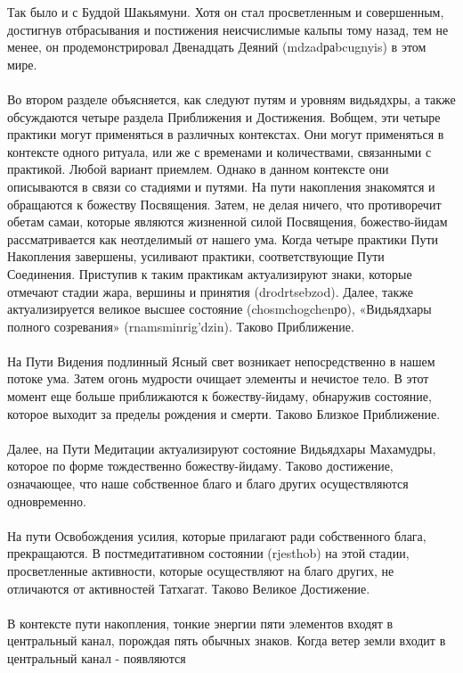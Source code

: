 Так было и с Буддой Шакьямуни. Хотя он стал просветленным и совершенным, 
достигнув отбрасывания и постижения неисчислимые кальпы тому назад, тем не менее, он 
продемонстрировал Двенадцать Деяний (mdzadраbcugnyis) в этом мире.\\
\\
Во втором разделе объясняется, как следуют путям и уровням видьядхры, а также 
обсуждаются четыре раздела Приближения и Достижения. Вобщем, эти четыре практики 
могут применяться в различных контекстах. Они могут применяться в контексте одного 
ритуала, или же с временами и количествами, связанными с практикой. Любой вариант 
приемлем. Однако в данном контексте они описываются в связи со стадиями и путями.
На пути накопления знакомятся и обращаются к божеству Посвящения. Затем, не делая
ничего, что противоречит обетам самаи, которые являются жизненной силой Посвящения, 
божество-йидам рассматривается как неотделимый от нашего ума. Когда четыре практики 
Пути Накопления завершены, усиливают практики, соответствующие Пути Соединения.
Приступив к таким практикам актуализируют знаки, которые отмечают стадии жара,
вершины и принятия (drodrtsebzod). Далее, также актуализируется великое высшее
состояние (chosmchogchenро), «Видьядхары полного созревания» (rnamsminrig'dzin). 
Таково Приближение.\\
\\
На Пути Видения подлинный Ясный свет возникает непосредственно в нашем потоке ума.
Затем огонь мудрости очищает элементы и нечистое тело. В этот момент еще больше 
приближаются к божеству-йидаму, обнаружив состояние, которое выходит за пределы 
рождения и смерти. Таково Близкое Приближение.\\
\\
Далее, на Пути Медитации актуализируют состояние Видьядхары Махамудры, которое по
форме тождественно божеству-йидаму. Таково достижение, означающее, что наше
собственное благо и благо других осуществляются одновременно.\\
\\
На пути Освобождения усилия, которые прилагают ради собственного блага, прекращаются.
В постмедитативном состоянии (rjesthob) на этой стадии, просветленные активности,
которые осуществляют на благо других, не отличаются от активностей Татхагат. Таково 
Великое Достижение.\\
\\
В контексте пути накопления, тонкие энергии пяти элементов входят в центральный канал,
порождая пять обычных знаков. Когда ветер земли входит в центральный канал - появляются
